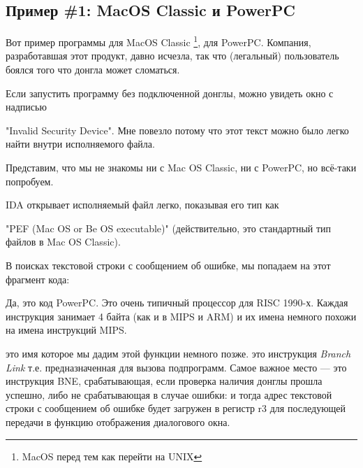 \newcommand{\PPC}{\InSqBrackets{\emph{PowerPC(tm) Microprocessor Family: The Programming Environments for 32-Bit Microprocessors}, (2000)}\footnote{\AlsoAvailableAs \url{http://yurichev.com/mirrors/PowerPC/6xx_pem.pdf}}}

\newcommand{\PPCABI}{[Steve Zucker, SunSoft and Kari Karhi, IBM, \emph{SYSTEM V APPLICATION BINARY INTERFACE: PowerPC Processor Supplement}, (1995)]\footnote{\AlsoAvailableAs \url{http://yurichev.com/mirrors/PowerPC/elfspec_ppc.pdf}}}

\subsection{Пример \#1: MacOS Classic и PowerPC}

Вот пример программы для MacOS Classic
\footnote{MacOS перед тем как перейти на UNIX}, для PowerPC.
Компания, разработавшая этот продукт, давно исчезла, так что (легальный) пользователь
боялся того что донгла может сломаться.

Если запустить программу без подключенной донглы, можно увидеть окно с надписью

"Invalid Security Device".
Мне повезло потому что этот текст можно было легко найти внутри исполняемого файла.

Представим, что мы не знакомы ни с Mac OS Classic, ни с PowerPC, но всё-таки попробуем.

\ac{IDA} открывает исполняемый файл легко, показывая его тип как
 
"PEF (Mac OS or Be OS executable)" (действительно, это стандартный тип файлов в Mac OS Classic).

В поисках текстовой строки с сообщением об ошибке, мы попадаем на этот фрагмент кода:



Да, это код PowerPC.
Это очень типичный процессор для \ac{RISC} 1990-х.
Каждая инструкция занимает 4 байта (как и в MIPS и ARM) и их имена немного похожи на имена 
инструкций MIPS.

 это имя которое мы дадим этой функции немного позже.
 это инструкция \emph{Branch Link} 
т.е. предназначенная для вызова подпрограмм.
Самое важное место --- это инструкция \ac{BNE}, срабатывающая, если проверка наличия донглы прошла
успешно, либо не срабатывающая в случае ошибки: и тогда адрес текстовой строки с сообщением об ошибке
будет загружен в регистр r3 для последующей передачи в функцию отображения диалогового окна.

